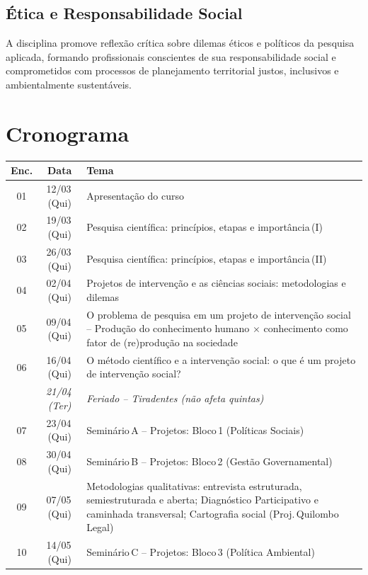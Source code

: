 \documentclass[11pt,a4paper]{article}
\begin{document}
\subsection*{Ética e Responsabilidade Social}
A disciplina promove reflexão crítica sobre dilemas éticos e políticos da pesquisa aplicada, formando profissionais conscientes de sua responsabilidade social e comprometidos com processos de planejamento territorial justos, inclusivos e ambientalmente sustentáveis.

\section*{Cronograma}

\begin{small}
\renewcommand{\arraystretch}{1.35}
\begin{tabularx}{\textwidth}{@{}c c X@{}}
\toprule
\textbf{Enc.} & \textbf{Data} & \textbf{Tema} \\
\midrule
01 & 12/03\,(Qui) & Apresentação do curso \\
02 & 19/03\,(Qui) & Pesquisa científica: princípios, etapas e importância\,(I) \\
03 & 26/03\,(Qui) & Pesquisa científica: princípios, etapas e importância\,(II) \\
04 & 02/04\,(Qui) & Projetos de intervenção e as ciências sociais: metodologias e dilemas \\
05 & 09/04\,(Qui) & O problema de pesquisa em um projeto de intervenção social -- Produção do conhecimento humano $\times$ conhecimento como fator de (re)produção na sociedade \\
06 & 16/04\,(Qui) & O método científico e a intervenção social: o que é um projeto de intervenção social? \\
\rowcolor{uefslight}
   & \textit{21/04\,(Ter)} & \textit{Feriado -- Tiradentes (não afeta quintas)} \\
07 & 23/04\,(Qui) & Seminário\,A -- Projetos: Bloco\,1 (Políticas Sociais) \\
08 & 30/04\,(Qui) & Seminário\,B -- Projetos: Bloco\,2 (Gestão Governamental) \\
09 & 07/05\,(Qui) & Metodologias qualitativas: entrevista estruturada, semiestruturada e aberta; Diagnóstico Participativo e caminhada transversal; Cartografia social (Proj.\,Quilombo Legal) \\
10 & 14/05\,(Qui) & Seminário\,C -- Projetos: Bloco\,3 (Política Ambiental) \\

\end{tabularx}
\end{small}
\end{document}
